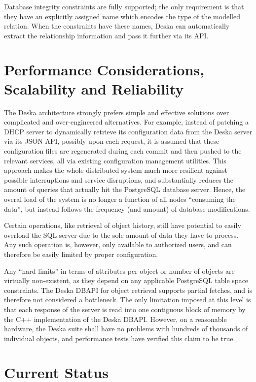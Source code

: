 \documentclass[a4paper]{jpconf}
\begin{document}
Database integrity constraints are fully supported; the only requirement is that they have an explicitly assigned name which encodes
the type of the modelled relation.  When the constraints have these names, Deska can automatically extract the relationship information
and pass it further via its API.

\section{Performance Considerations, Scalability and Reliability}

The Deska architecture strongly prefers simple and effective solutions over complicated and over-engineered alternatives.  For example,
instead of patching a DHCP server to dynamically retrieve its configuration data from the Deska server via its JSON API, possibly upon
each request, it is assumed that these configuration files are regenerated during each commit and then pushed to the relevant services,
all via existing configuration management utilities.  This approach makes the whole distributed system much more resilient against
possible interruptions and service disruptions, and substantially reduces the amount of queries that actually hit the PostgreSQL
database server.  Hence, the overal load of the system is no longer a function of all nodes ``consuming the data'', but instead follows
the frequency (and amount) of database modifications.

Certain operations, like retrieval of object history, still have potential to easily overload the SQL server due to the sole amount of
data they have to process.  Any such operation is, however, only available to authorized users, and can therefore be easily limited by
proper configuration.

Any ``hard limits'' in terms of attributes-per-object or number of objects are virtually non-existent, as they depend on any applicable
PostgreSQL table space constraints.  The Deska DBAPI for object retrieval supports partial fetches, and is therefore not considered a
bottleneck.  The only limitation imposed at this level is that each response of the server is read into one contiguous block of memory
by the C++ implementation of the Deska DBAPI.  However, on a reasonable hardware, the Deska suite shall have no problems with hundreds
of thousands of individual objects, and performance tests have verified this claim to be true.

\section{Current Status}
\end{document}
